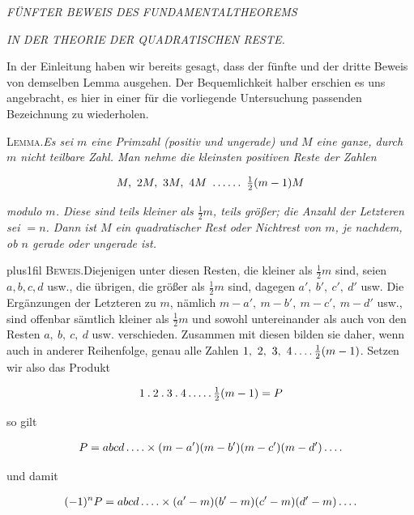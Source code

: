 \begin{center}
\textit{FÜNFTER BEWEIS DES FUNDAMENTALTHEOREMS}\par
\textit{IN DER THEORIE DER QUADRATISCHEN RESTE.}
\end{center}


In der Einleitung haben wir bereits gesagt, dass der fünfte und der dritte Beweis von demselben Lemma ausgehen. Der Bequemlichkeit halber erschien es uns angebracht, es hier in einer für die vorliegende Untersuchung passenden Bezeichnung zu wiederholen.

\textsc{Lemma.}\quad \textit{Es sei $m$ eine Primzahl (positiv und ungerade) und $M$ eine ganze, durch $m$ nicht teilbare Zahl. Man nehme die kleinsten positiven Reste der Zahlen}

\[
\begin{aligned}
M,\ 2M,\ 3M,\ 4M\ \mathinner{.\,.\,.\,.\,.\,.}\ \tfrac12(m-1)M
\end{aligned}
\]

\textit{modulo $m$. Diese sind teils kleiner als $\tfrac12m$, teils größer; die Anzahl der Letzteren sei $=n$. Dann ist $M$ ein quadratischer Rest oder Nichtrest von $m$, je nachdem, ob $n$ gerade oder ungerade ist.}

{\rightskip=0pt plus1fil \textsc{Beweis.}\quad Diejenigen unter diesen Resten, die kleiner als $\tfrac12m$ sind, seien $a,b,c,d$ usw., die übrigen, die größer als $\tfrac12m$ sind, dagegen $a',\ b',\ c',\ d'$ usw. Die Ergänzungen der Letzteren zu $m$, nämlich \mbox{$m-a',\ m-b',\ m-c',\ m-d'$} usw., sind offenbar sämtlich kleiner als $\tfrac12m$ und sowohl untereinander als auch von den Resten $a,\ b,\ c,\ d$ usw. verschieden. Zusammen mit diesen bilden sie daher, wenn auch in anderer Reihenfolge, genau alle Zahlen $1,\ 2,\ 3,\ 4\dotsfour\tfrac12(m-1)$. Setzen wir also das Produkt\par}

\[
\begin{aligned}
1\mathbin{.}2\mathbin{.}3\mathbin{.}4\mathinner{.\,.\,.\,.\,.}\tfrac12(m-1)=P
\end{aligned}
\]

so gilt

\[
\begin{aligned}
P=abcd\mathinner{.\,.\,.\,.}\times(m-a')(m-b')(m-c')(m-d')\mathinner{.\,.\,.\,.}
\end{aligned}
\]

und damit

\[
\begin{aligned}
(-1)^nP=abcd\mathinner{.\,.\,.\,.}\times(a'-m)(b'-m)(c'-m)(d'-m)\mathinner{.\,.\,.\,.}
\end{aligned}
\]

